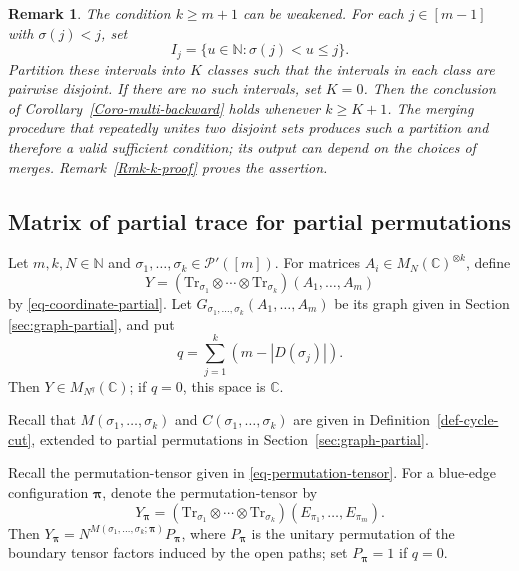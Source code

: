 \documentclass[12pt]{article}
\numberwithin{equation}{section}
\theoremstyle{plain}
\newtheorem{remark}[theorem]{Remark}
\def\bN{\mathbb N}
\def\bC{\mathbb C}
\def\cP{\mathcal P}
\def\Tr{\mathrm {Tr}}
\begin{document}
\begin{remark} \label{Rmk-k}
The condition $k\ge m+1$ can be weakened. For each $j\in[m-1]$ with $\sigma(j)<j$, set
\[
I_j=\{u\in\bN:\sigma(j)<u\le j\}.
\]
Partition these intervals into $K$ classes such that the intervals in each class are pairwise disjoint. If there are no such intervals, set $K=0$. Then the conclusion of Corollary~\ref{Coro-multi-backward} holds whenever $k\ge K+1$. The merging procedure that repeatedly unites two disjoint sets produces such a partition and therefore a valid sufficient condition; its output can depend on the choices of merges. Remark~\ref{Rmk-k-proof} proves the assertion.
\end{remark}


\subsection{Matrix of partial trace for partial permutations} \label{sec:matrix-multi-partial}

Let $m,k,N\in\bN$ and $\sigma_1,\ldots,\sigma_k\in\cP'([m])$. For matrices $A_i\in M_N(\bC)^{\otimes k}$, define
\[
Y=(\Tr_{\sigma_1}\otimes\cdots\otimes\Tr_{\sigma_k})(A_1,\ldots,A_m)
\]
by \eqref{eq-coordinate-partial}. Let $G_{\sigma_1,\ldots,\sigma_k}(A_1,\ldots,A_m)$ be its graph given in Section \ref{sec:graph-partial}, and put
\[
q=\sum_{j=1}^k(m-|D(\sigma_j)|).
\]
Then $Y\in M_{N^q}(\bC)$; if $q=0$, this space is $\bC$.

Recall that $M(\sigma_1,\ldots,\sigma_k)$ and $C(\sigma_1,\ldots,\sigma_k)$ are given in Definition~\ref{def-cycle-cut}, extended to partial permutations in Section~\ref{sec:graph-partial}.

Recall the permutation-tensor given in \eqref{eq-permutation-tensor}.
For a blue-edge configuration $\boldsymbol\pi$, denote the permutation-tensor by
\[
Y_{\boldsymbol\pi}
=(\Tr_{\sigma_1}\otimes\cdots\otimes\Tr_{\sigma_k})(E_{\pi_1},\ldots,E_{\pi_m}).
\]
Then $Y_{\boldsymbol\pi}=N^{M(\sigma_1,\ldots,\sigma_k;\boldsymbol\pi)}P_{\boldsymbol\pi}$, where $P_{\boldsymbol\pi}$ is the unitary permutation of the boundary tensor factors induced by the open paths; set $P_{\boldsymbol\pi}=1$ if $q=0$.
\end{document}
